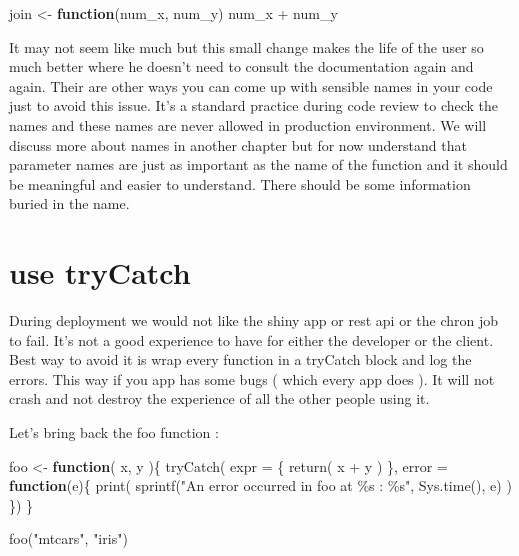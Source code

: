 \documentclass[
]{book}
\newenvironment{Shaded}{\begin{snugshade}}{\end{snugshade}}
\newcommand{\AttributeTok}[1]{\textcolor[rgb]{0.77,0.63,0.00}{#1}}
\newcommand{\ControlFlowTok}[1]{\textcolor[rgb]{0.13,0.29,0.53}{\textbf{#1}}}
\newcommand{\FunctionTok}[1]{\textcolor[rgb]{0.00,0.00,0.00}{#1}}
\newcommand{\NormalTok}[1]{#1}
\newcommand{\OtherTok}[1]{\textcolor[rgb]{0.56,0.35,0.01}{#1}}
\newcommand{\SpecialCharTok}[1]{\textcolor[rgb]{0.00,0.00,0.00}{#1}}
\newcommand{\StringTok}[1]{\textcolor[rgb]{0.31,0.60,0.02}{#1}}
\begin{document}
\begin{Shaded}
\begin{Highlighting}[]
\NormalTok{join }\OtherTok{\textless{}{-}} \ControlFlowTok{function}\NormalTok{(num\_x, num\_y) num\_x }\SpecialCharTok{+}\NormalTok{ num\_y}
\end{Highlighting}
\end{Shaded}

It may not seem like much but this small change makes the life of the user so much better where he doesn't need to consult the documentation again and again. Their are other ways you can come up with sensible names in your code just to avoid this issue. It's a standard practice during code review to check the names and these names are never allowed in production environment. We will discuss more about names in another chapter but for now understand that parameter names are just as important as the name of the function and it should be meaningful and easier to understand. There should be some information buried in the name.

\hypertarget{use-trycatch}{%
\section{use tryCatch}\label{use-trycatch}}

During deployment we would not like the shiny app or rest api or the chron job to fail. It's not a good experience to have for either the developer or the client. Best way to avoid it is wrap every function in a tryCatch block and log the errors. This way if you app has some bugs ( which every app does ). It will not crash and not destroy the experience of all the other people using it.

Let's bring back the foo function :

\begin{Shaded}
\begin{Highlighting}[]
\NormalTok{foo }\OtherTok{\textless{}{-}} \ControlFlowTok{function}\NormalTok{( x, y )\{}
   \FunctionTok{tryCatch}\NormalTok{(}
     \AttributeTok{expr =}\NormalTok{ \{}
       \FunctionTok{return}\NormalTok{( x }\SpecialCharTok{+}\NormalTok{ y )}
\NormalTok{     \},}
     \AttributeTok{error =} \ControlFlowTok{function}\NormalTok{(e)\{}
       \FunctionTok{print}\NormalTok{(}
         \FunctionTok{sprintf}\NormalTok{(}\StringTok{"An error occurred in foo at \%s : \%s"}\NormalTok{,}
                 \FunctionTok{Sys.time}\NormalTok{(),}
\NormalTok{                 e)}
\NormalTok{         )}
\NormalTok{     \})}
\NormalTok{\}}

\FunctionTok{foo}\NormalTok{(}\StringTok{"mtcars"}\NormalTok{, }\StringTok{"iris"}\NormalTok{)}
\end{Highlighting}
\end{Shaded}
\end{document}
